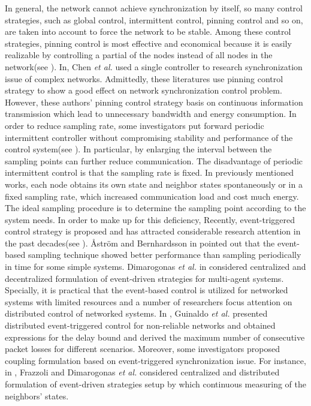 In general, the network cannot achieve synchronization by itself, so many control strategies, such as global control, intermittent control, pinning control and so on, are taken into account to force the network to be stable. Among these control strategies, pinning control is most effective and  economical because it is easily realizable by controlling a partial of the nodes instead of all nodes in the network(see \cite{Pin_control_nodeset,pinning1,pinning2,pinning3}). In\cite{pinning-control}, Chen \emph{et al.} used a single controller to research synchronization issue of complex networks. Admittedly, these literatures use pinning control strategy to show a good effect on network synchronization control problem. However, these authors' pinning control strategy basis on continuous information transmission which lead to unnecessary bandwidth and energy consumption. In order to reduce sampling rate, some investigators put forward periodic intermittent controller without compromising stability and performance of the control system(see \cite{Periodically1,Periodically2,Periodically3,sampledata-control}). In particular, by enlarging the interval between the sampling points can further reduce communication. The disadvantage of periodic intermittent control is that the sampling rate is fixed. In previously mentioned works, each node obtains its own state and neighbor states spontaneously or in a fixed sampling rate, which increased communication load and cost much energy.
The ideal sampling procedure is to determine the sampling point according to the system needs. In order to make up for this deficiency, Recently, event-triggered control strategy is proposed and has attracted considerable research attention in the past decades(see \cite{comparison,even_triggered,even_triggered_multi,p2-linear-driven,self-triggered,c4,c5}). {\AA}str\"{o}m and Bernhardsson in \cite{comparison} pointed out that the event-based sampling technique showed better performance than sampling periodically in time for some simple systems. Dimarogonas \emph{et al.} in \cite{even_triggered_multi} considered centralized and decentralized formulation of event-driven strategies for multi-agent systems. Specially, it is practical that the event-based control is utilized for networked systems with limited resources and a number of researchers focus attention on distributed control of networked systems. In \cite{p1-nonlinear-triger}, Guinaldo \emph{et al.} presented distributed event-triggered control for non-reliable networks and obtained expressions for the delay bound and derived the maximum number of consecutive packet losses for different scenarios. Moreover, some investigators proposed coupling formulation based on event-triggered synchronization issue. For instance, in \cite{A-Distributed-event-triggered}, Frazzoli and Dimarogonas \emph{et al.} considered centralized and distributed formulation of event-driven strategies setup by which continuous measuring of the neighbors' states.

